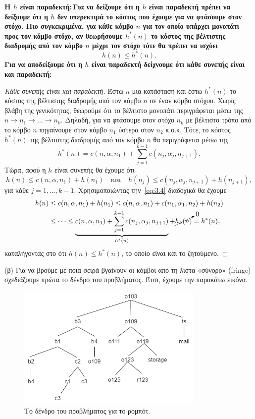 \documentclass[12pt]{article}
\newcommand {\lat}{\latintext}
\theoremstyle{definition}
\begin{document}
\noindent \bf Η $h$ είναι παραδεκτή:\,\normalfont Για να δείξουμε ότι η $h$ είναι παραδεκτή πρέπει να δείξουμε ότι η $h$ δεν υπερεκτιμά το κόστος που έχουμε για να φτάσουμε στον στόχο. Πιο συγκεκριμένα, για κάθε κόμβο $n$ για τον οποίο υπάρχει μονοπάτι προς τον κόμβο στόχο, αν θεωρήσουμε $h^*(n)$ το κόστος της βέλτιστης διαδρομής από τον κόμβο $n$ μέχρι τον στόχο τότε θα πρέπει να ισχύει
\[\tag{3.2}\label{eq:3.2}
h(n)\leq h^*(n).
\]
\noindent Για να αποδείξουμε ότι η $h$ είναι παραδεκτή δείχνουμε ότι κάθε συνεπής είναι και παραδεκτή:

\begin{proof}[Κάθε συνεπής είναι και παραδεκτή]\normalfont Έστω $n$ μια κατάσταση και έστω $h^*(n)$ το κόστος της βέλτιστης διαδρομής από τον κόμβο $n$ σε έναν κόμβο στόχου. Χωρίς βλάβη της γενικότητας, θεωρούμε ότι το βέλτιστο μονοπάτι περιγράφεται μέσω της $n\to n_1\to\dots\to n_k$. Δηλαδή, για να φτάσουμε στον στόχο $n_k$ με βέλτιστο τρόπο από το κόμβο $n$ πηγαίνουμε στον κόμβο $n_1$ ύστερα στον $n_2$ κ.ο.κ. Τότε, το κόστος $h^*(n)$ της βέλτιστης διαδρομής από τον κόμβο $n$ θα περιγράφεται μέσω της
\[\tag{3.3}\label{eq:3.3}
h^*(n) = c(n,\alpha,n_1) +\sum_{j=1}^{k-1}c(n_j,\alpha_j,n_{j+1}).
\]
\noindent Τώρα, αφού η $h$ είναι συνεπής θα έχουμε ότι
\[\tag{3.4}\label{eq:3.4}
h(n)\leq c(n,\alpha,n_1)+h(n_1)\quad \text{και}\quad h(n_j)\leq c(n_j,\alpha_j,n_{j+1})+h(n_{j+1}),
\]
\noindent για κάθε $j=1,\dots,k-1$. Χρησιμοποιώντας την~\eqref{eq:3.4} διαδοχικά θα έχουμε
\begin{align*}
    h(n)&\leq c(n,\alpha,n_1)+h(n_1)\leq c(n,\alpha,n_1)+c(n_1,\alpha_1,n_2)+h(n_2)\\
    &\leq \dots \leq \underbrace{c(n,\alpha,n_1)+\sum_{j=1}^{k-1}c(n_j,\alpha_j,n_{j+1})}_{h^*(n)}+\cancelto{0}{h_k(n)} = h^*(n),
\end{align*}
\noindent καταλήγοντας στο ότι $h(n)\leq h^*(n)$, το οποίο είναι και το ζητούμενο.
\end{proof}

\noindent (β) Για να βρούμε με ποια σειρά βγαίνουν οι κόμβοι από τη λίστα «σύνορο» ({\lat fringe}) σχεδιάζουμε πρώτα το δένδρο του προβλήματος. Έτσι, έχουμε την παρακάτω εικόνα.

\begin{figure}[H]
    \centering
	\includegraphics[width = 90mm,scale=0.90]{images/tree2.png}
	\vspace*{-3mm}
	\caption{Το δένδρο του προβλήματος για το ρομπότ.}
	\label{fig:mesh1}
\end{figure}
\vspace{1mm}
\end{document}
